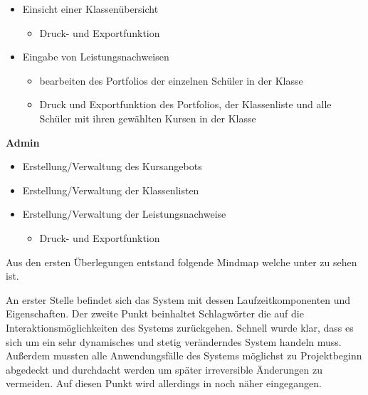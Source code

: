 \begin{itemize}
  \item Einsicht einer Klassenübersicht
  \begin{itemize}
    \item Druck- und Exportfunktion 
  \end{itemize}
  \item Eingabe von Leistungsnachweisen
  \begin{itemize}
    \item bearbeiten des Portfolios der einzelnen Schüler in der Klasse
    \item Druck und Exportfunktion des Portfolios, der Klassenliste und alle Schüler mit ihren gewählten Kursen in der Klasse
  \end{itemize}
\end{itemize}
 
\textbf{Admin}

\begin{itemize}
  \item Erstellung/Verwaltung des Kursangebots
  \item Erstellung/Verwaltung der Klassenlisten
  \item Erstellung/Verwaltung der Leistungsnachweise
  \begin{itemize}
    \item Druck- und Exportfunktion
  \end{itemize}
\end{itemize}

Aus den ersten Überlegungen entstand folgende Mindmap welche unter  zu sehen ist.

An erster Stelle befindet sich das System mit dessen Laufzeitkomponenten und Eigenschaften. Der zweite Punkt beinhaltet Schlagwörter die auf die Interaktionsmöglichkeiten des Systems zurückgehen. Schnell wurde klar, dass es sich um ein sehr dynamisches und stetig veränderndes System handeln muss. Außerdem mussten alle Anwendungsfälle des Systems möglichst zu Projektbeginn abgedeckt und durchdacht werden um später irreversible Änderungen zu vermeiden. Auf diesen Punkt wird allerdings in  noch näher eingegangen.

